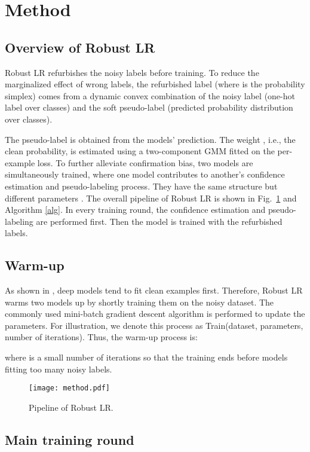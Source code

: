 \documentclass[letterpaper]{article} \usepackage{aaai23}  \usepackage{times}  \usepackage{helvet}  \usepackage{courier}  \usepackage[hyphens]{url}  \usepackage{graphicx} \urlstyle{rm} \def\UrlFont{\rm}  \usepackage{natbib}  \usepackage{caption} \frenchspacing  \setlength{\pdfpagewidth}{8.5in} \setlength{\pdfpageheight}{11in} \usepackage{algorithm}
\begin{document}
\section{Method}
\subsection{Overview of Robust LR}

Robust LR refurbishes the noisy labels before training.
To reduce the marginalized effect of wrong labels, the refurbished label  (where  is the probability simplex) comes from a dynamic convex combination of the noisy label  (one-hot label over  classes) and the soft pseudo-label  (predicted probability distribution over  classes).

The pseudo-label  is obtained from the models' prediction.
The weight , i.e., the clean probability, is estimated using a two-component GMM fitted on the per-example loss.
To further alleviate confirmation bias, two models are simultaneously trained, where one model contributes to another's confidence estimation and pseudo-labeling process.
They have the same structure but different parameters .
The overall pipeline of Robust LR is shown in Fig.~\ref{fig_Robust LR} and Algorithm \ref{alg}. 
In every training round, the confidence estimation and pseudo-labeling are performed first. 
Then the model is trained with the refurbished labels. 

\subsection{Warm-up}
As shown in \cite{arpit2017closer}, deep models tend to fit clean examples first.
Therefore, Robust LR warms two models up by shortly training them on the noisy dataset. The commonly used mini-batch gradient descent algorithm is performed to update the parameters.
For illustration, we denote this process as Train(dataset, parameters, number of iterations). Thus, the warm-up process is:

where  is a small number of iterations so that the training ends before models fitting too many noisy labels. 

\begin{figure}
\centering
\texttt{[image: method.pdf]}
    \caption{Pipeline of Robust LR.
    }
    \label{fig_Robust LR}
\end{figure}


\subsection{Main training round}
\end{document}
